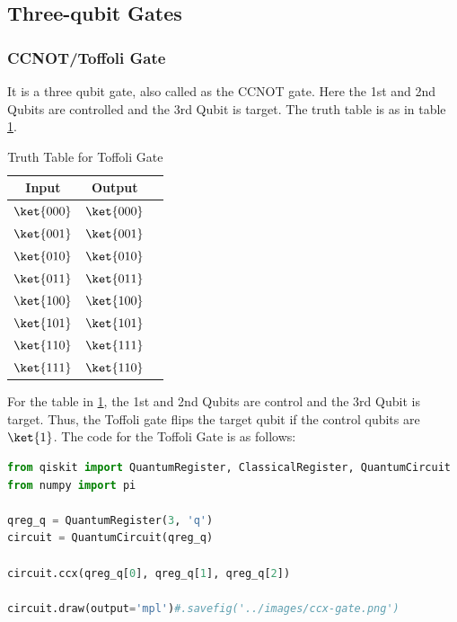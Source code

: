 \documentclass[12pt, oneside]{book}
\theoremstyle{definition}
\theoremstyle{definition}
\theoremstyle{remark}
\begin{document}
\subsection{Three-qubit Gates}
\subsubsection{CCNOT/Toffoli Gate}
It is a three qubit gate, also called as the CCNOT gate.
Here the 1st and 2nd Qubits are controlled and the 3rd Qubit is target.
The truth table is as in table \ref{tab:toffoli}.
\begin{table}[H]
    \centering
    \begin{tabular}{|c|c|c|}
        \hline
        Input & Output\\
        \hline
        $\ket{000}$ & $\ket{000}$\\
        $\ket{001}$   & $\ket{001}$\\
        $\ket{010}$   & $\ket{010}$\\
        $\ket{011}$  & $\ket{011}$\\
        $\ket{100}$ & $\ket{100}$\\
        $\ket{101}$   & $\ket{101}$\\
        $\ket{110}$   & $\ket{111}$\\
        $\ket{111}$  & $\ket{110}$\\
        \hline
    \end{tabular}
    \caption{Truth Table for Toffoli Gate}
    \label{tab:toffoli}
\end{table}
For the table in \ref{tab:toffoli}, the 1st and 2nd Qubits are control and the 3rd Qubit is target.
Thus, the Toffoli gate flips the target qubit if the control qubits are $\ket{1}$.
The code for the Toffoli Gate is as follows:
\begin{lstlisting}[language=Python]
from qiskit import QuantumRegister, ClassicalRegister, QuantumCircuit
from numpy import pi

qreg_q = QuantumRegister(3, 'q')
circuit = QuantumCircuit(qreg_q)

circuit.ccx(qreg_q[0], qreg_q[1], qreg_q[2])

circuit.draw(output='mpl')#.savefig('../images/ccx-gate.png')
\end{lstlisting}
\end{document}

